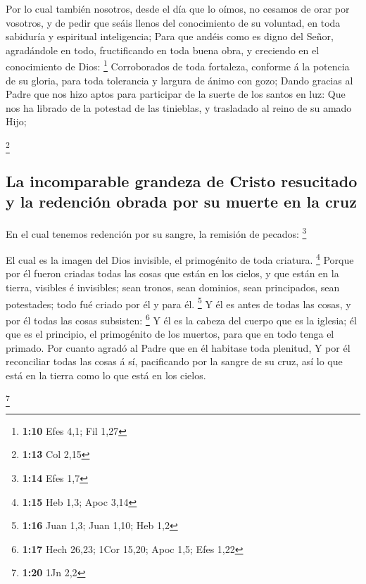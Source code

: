  Por lo cual también nosotros, desde el día que lo oímos,
no cesamos de orar por vosotros, y de pedir que seáis llenos del
conocimiento de su voluntad, en toda sabiduría y espiritual
inteligencia;  Para que andéis como es digno del Señor,
agradándole en todo, fructificando en toda buena obra, y creciendo en el
conocimiento de Dios: \footnote{\textbf{1:10} Efes 4,1; Fil 1,27}
 Corroborados de toda fortaleza, conforme á la potencia
de su gloria, para toda tolerancia y largura de ánimo con gozo;
 Dando gracias al Padre que nos hizo aptos para
participar de la suerte de los santos en luz:  Que nos ha
librado de la potestad de las tinieblas, y trasladado al reino de su
amado Hijo;

\footnote{\textbf{1:13} Col 2,15}

\hypertarget{la-incomparable-grandeza-de-cristo-resucitado-y-la-redenciuxf3n-obrada-por-su-muerte-en-la-cruz}{%
\subsection{La incomparable grandeza de Cristo resucitado y la redención
obrada por su muerte en la
cruz}\label{la-incomparable-grandeza-de-cristo-resucitado-y-la-redenciuxf3n-obrada-por-su-muerte-en-la-cruz}}

 En el cual tenemos redención por su sangre, la remisión
de pecados: \footnote{\textbf{1:14} Efes 1,7}

 El cual es la imagen del Dios invisible, el primogénito
de toda criatura. \footnote{\textbf{1:15} Heb 1,3; Apoc 3,14}
 Porque por él fueron criadas todas las cosas que están
en los cielos, y que están en la tierra, visibles é invisibles; sean
tronos, sean dominios, sean principados, sean potestades; todo fué
criado por él y para él. \footnote{\textbf{1:16} Juan 1,3; Juan 1,10;
  Heb 1,2}  Y él es antes de todas las cosas, y por él
todas las cosas subsisten: \footnote{\textbf{1:17} Hech 26,23; 1Cor
  15,20; Apoc 1,5; Efes 1,22}  Y él es la cabeza del
cuerpo que es la iglesia; él que es el principio, el primogénito de los
muertos, para que en todo tenga el primado.  Por cuanto
agradó al Padre que en él habitase toda plenitud,  Y por
él reconciliar todas las cosas á sí, pacificando por la sangre de su
cruz, así lo que está en la tierra como lo que está en los cielos.

\footnote{\textbf{1:20} 1Jn 2,2}

